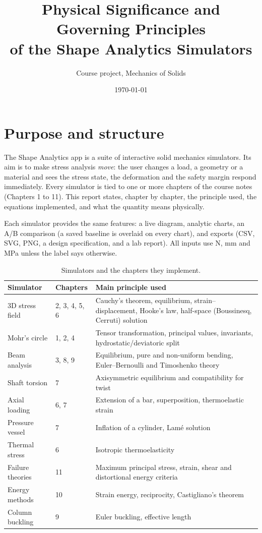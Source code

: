 \documentclass[11pt,a4paper]{article}
\title{Physical Significance and Governing Principles\\of the Shape Analytics Simulators}
\author{Course project, Mechanics of Solids}
\date{\today}
\begin{document}
\maketitle
\tableofcontents
\newpage

\section{Purpose and structure}
The Shape Analytics app is a suite of interactive solid mechanics simulators. Its aim is to make stress analysis \emph{move}: the user changes a load, a geometry or a material and sees the stress state, the deformation and the safety margin respond immediately. Every simulator is tied to one or more chapters of the course notes (Chapters 1 to 11). This report states, chapter by chapter, the principle used, the equations implemented, and what the quantity means physically.

Each simulator provides the same features: a live diagram, analytic charts, an A/B comparison (a saved baseline is overlaid on every chart), and exports (CSV, SVG, PNG, a design specification, and a lab report). All inputs use N, mm and MPa unless the label says otherwise.

\begin{table}[h]
\centering
\begin{tabular}{@{}p{3.6cm}p{3.1cm}p{7.3cm}@{}}
\toprule
Simulator & Chapters & Main principle used\\
\midrule
3D stress field & 2, 3, 4, 5, 6 & Cauchy's theorem, equilibrium, strain--displacement, Hooke's law, half-space (Boussinesq, Cerruti) solution\\
Mohr's circle & 1, 2, 4 & Tensor transformation, principal values, invariants, hydrostatic/deviatoric split\\
Beam analysis & 3, 8, 9 & Equilibrium, pure and non-uniform bending, Euler--Bernoulli and Timoshenko theory\\
Shaft torsion & 7 & Axisymmetric equilibrium and compatibility for twist\\
Axial loading & 6, 7 & Extension of a bar, superposition, thermoelastic strain\\
Pressure vessel & 7 & Inflation of a cylinder, Lam\'e solution\\
Thermal stress & 6 & Isotropic thermoelasticity\\
Failure theories & 11 & Maximum principal stress, strain, shear and distortional energy criteria\\
Energy methods & 10 & Strain energy, reciprocity, Castigliano's theorem\\
Column buckling & 9 & Euler buckling, effective length\\
\bottomrule
\end{tabular}
\caption{Simulators and the chapters they implement.}
\end{table}
\end{document}
